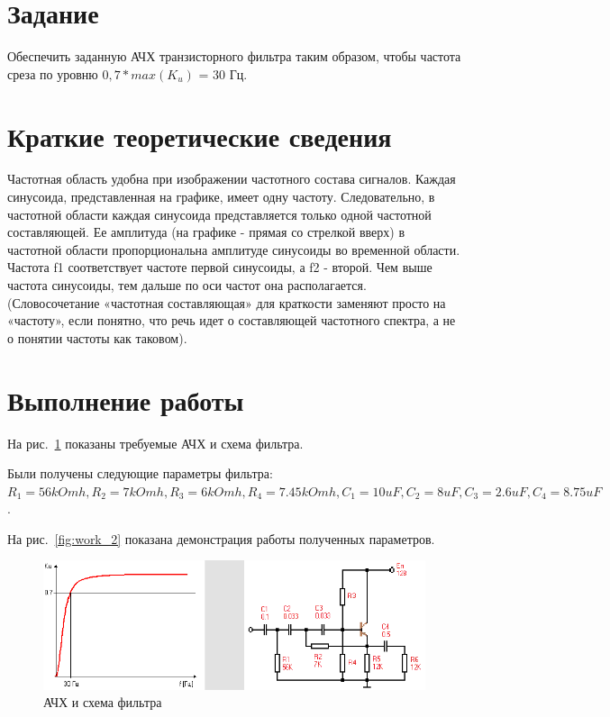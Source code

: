 \documentclass[a4paper,14pt]{article}
\begin{document}

\tableofcontents
\pagebreak

\section{Задание}

Обеспечить заданную АЧХ транзисторного фильтра таким образом, чтобы частота среза по уровню $0,7*max(K_u)$ = 30 Гц.

\section{Краткие теоретические сведения}

Частотная область удобна при изображении частотного состава сигналов.
Каждая синусоида, представленная на графике, имеет одну частоту. 
Следовательно, в частотной области каждая синусоида представляется только одной частотной составляющей.
Ее амплитуда (на графике - прямая со стрелкой вверх) в частотной области пропорциональна амплитуде синусоиды во временной области. 
Частота f1 соответствует частоте первой синусоиды, а f2 - второй. 
Чем выше частота синусоиды, тем дальше по оси частот она располагается. 
(Словосочетание «частотная составляющая» для краткости заменяют просто на «частоту», если понятно, что речь идет о составляющей частотного спектра, а не о понятии частоты как таковом).

\section{Выполнение работы}

На рис.~\ref{fig:work_1} показаны требуемые АЧХ и схема фильтра.

Были получены следующие параметры фильтра:
$R_1 = 56 kOmh, R_2 = 7 kOmh, R_3 = 6 kOmh, R_4 = 7.45 kOmh, C_1 = 10 uF, C_2 = 8 uF, C_3 = 2.6 uF, C_4 = 8.75 uF$.

На рис.~\ref{fig:work_2} показана демонстрация работы полученных параметров.

\begin{figure}[H]
	\centering
	\includegraphics[width=0.9\linewidth]{image/work_1}
	\caption{АЧХ и схема фильтра}
	\label{fig:work_1}
\end{figure}
\end{document}
